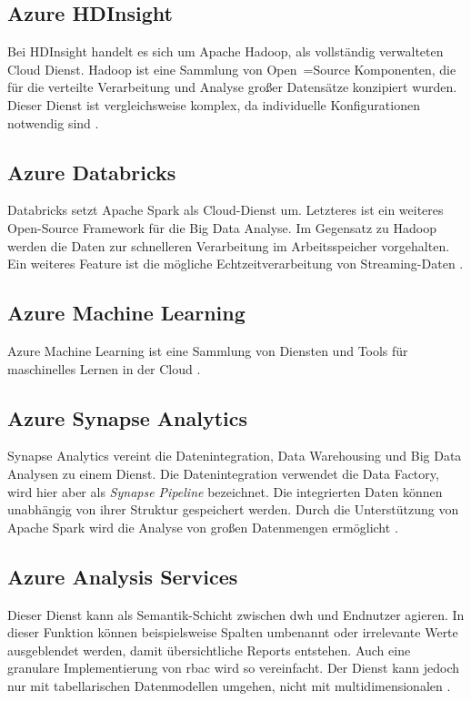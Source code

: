 \subsection{Azure HDInsight} \label{sec:grundlagen:azure_dienste:hdInsight}
Bei HDInsight handelt es sich um Apache Hadoop, als vollständig verwalteten Cloud Dienst. Hadoop ist eine Sammlung von Open~=Source Komponenten, die für die verteilte Verarbeitung und Analyse großer Datensätze konzipiert wurden. Dieser Dienst ist vergleichsweise komplex, da individuelle Konfigurationen notwendig sind \cite{klein_iot_2017}.

\subsection{Azure Databricks} \label{sec:grundlagen:azure_dienste:databricks}
Databricks setzt Apache Spark als Cloud-Dienst um. Letzteres ist ein weiteres Open-Source Framework für die Big Data Analyse. Im Gegensatz zu Hadoop werden die Daten zur schnelleren Verarbeitung im Arbeitsspeicher vorgehalten. Ein weiteres Feature ist die mögliche Echtzeitverarbeitung von Streaming-Daten \cite{soh_data_2020}.

\subsection{Azure Machine Learning} \label{sec:grundlagen:azure_dienste:machineLearning}
Azure Machine Learning ist eine Sammlung von Diensten und Tools für maschinelles Lernen in der Cloud \cite{soh_data_2020}.

\subsection{Azure Synapse Analytics} \label{sec:grundlagen:azure_dienste:synapseAnalytics}
Synapse Analytics vereint die Datenintegration, Data Warehousing und Big Data Analysen zu einem Dienst. Die Datenintegration verwendet die Data Factory, wird hier aber als \textit{Synapse Pipeline} bezeichnet. Die integrierten Daten können unabhängig von ihrer Struktur gespeichert werden. Durch die Unterstützung von Apache Spark wird die Analyse von großen Datenmengen ermöglicht \cite{shiyal_beginning_2021}.

\subsection{Azure Analysis Services} \label{sec:grundlagen:azure_dienste:analysisServices}
Dieser Dienst kann als Semantik-Schicht zwischen \ac{dwh} und Endnutzer agieren. In dieser Funktion können beispielsweise Spalten umbenannt oder irrelevante Werte ausgeblendet werden, damit übersichtliche Reports entstehen. Auch eine granulare Implementierung von \ac{rbac} wird so vereinfacht. Der Dienst kann jedoch nur mit tabellarischen Datenmodellen umgehen, nicht mit multidimensionalen \cite{how_beyond_2020}.

